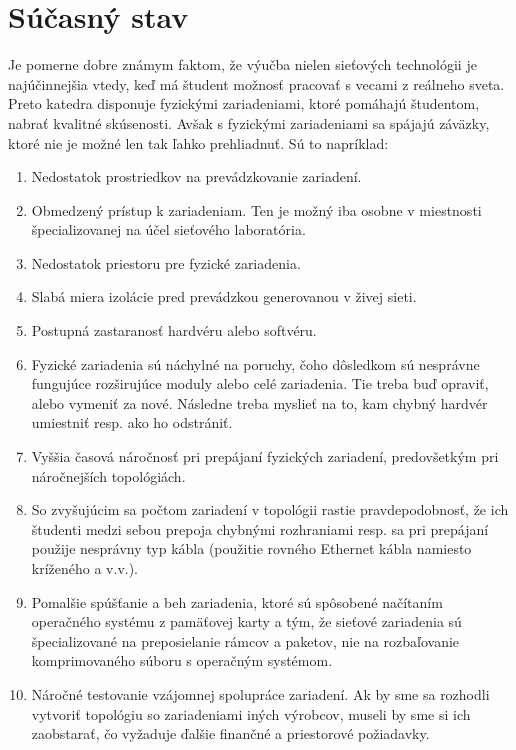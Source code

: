 \chapter{Súčasný stav}

Je pomerne dobre známym faktom, že výučba nielen sieťových technológii je najúčinnejšia vtedy, keď má študent možnosť pracovať s vecami z reálneho sveta. Preto katedra disponuje fyzickými zariadeniami, ktoré pomáhajú študentom, nabrať kvalitné skúsenosti. Avšak s fyzickými zariadeniami sa spájajú záväzky, ktoré nie je možné len tak ľahko prehliadnuť. Sú to napríklad:

\begin{enumerate}[noitemsep]
    \item Nedostatok prostriedkov na prevádzkovanie zariadení.
    \item Obmedzený prístup k zariadeniam. Ten je možný iba osobne v miestnosti špecializovanej na účel sieťového laboratória.
    \item Nedostatok priestoru pre fyzické zariadenia.
    \item Slabá miera izolácie pred prevádzkou generovanou v živej sieti.
    \item Postupná zastaranosť hardvéru alebo softvéru.
    \item Fyzické zariadenia sú náchylné na poruchy, čoho dôsledkom sú nesprávne fungujúce rozširujúce moduly alebo celé zariadenia. Tie treba buď opraviť, alebo vymeniť za nové. Následne treba myslieť na to, kam chybný hardvér umiestniť resp. ako ho odstrániť.
    \item Vyššia časová náročnosť pri prepájaní fyzických zariadení, predovšetkým pri náročnejších topológiách.
    \item So zvyšujúcim sa počtom zariadení v topológii rastie pravdepodobnosť, že ich študenti medzi sebou prepoja chybnými rozhraniami resp. sa pri prepájaní použije nesprávny typ kábla (použitie rovného Ethernet kábla namiesto kríženého a v.v.).
    \item Pomalšie spúšťanie a beh zariadenia, ktoré sú spôsobené načítaním operačného systému z pamäťovej karty a tým, že sieťové zariadenia sú špecializované na preposielanie rámcov a paketov, nie na rozbaľovanie komprimovaného súboru s operačným systémom.
    \item Náročné testovanie vzájomnej spolupráce zariadení. Ak by sme sa rozhodli vytvoriť topológiu so zariadeniami iných výrobcov, museli by sme si ich zaobstarať, čo vyžaduje ďalšie finančné a priestorové požiadavky.
\end{enumerate}


